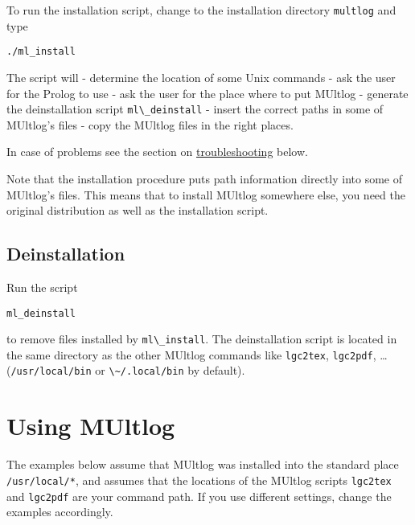 \documentclass[]{article}
\newcommand{\passthrough}[1]{#1}
\begin{document}
To run the installation script, change to the installation directory
\passthrough{\lstinline!multlog!} and type

\begin{lstlisting}
./ml_install
\end{lstlisting}

The script will - determine the location of some Unix commands - ask the
user for the Prolog to use - ask the user for the place where to put
MUltlog - generate the deinstallation script
\passthrough{\lstinline!ml\_deinstall!} - insert the correct paths in
some of MUltlog's files - copy the MUltlog files in the right places.

In case of problems see the section on
\protect\hyperlink{troubleshooting}{troubleshooting} below.

Note that the installation procedure puts path information directly into
some of MUltlog's files. This means that to install MUltlog somewhere
else, you need the original distribution as well as the installation
script.

\hypertarget{deinstallation}{%
\subsection{Deinstallation}\label{deinstallation}}

Run the script

\begin{lstlisting}
ml_deinstall
\end{lstlisting}

to remove files installed by \passthrough{\lstinline!ml\_install!}. The
deinstallation script is located in the same directory as the other
MUltlog commands like \passthrough{\lstinline!lgc2tex!},
\passthrough{\lstinline!lgc2pdf!}, \ldots{}
(\passthrough{\lstinline!/usr/local/bin!} or
\passthrough{\lstinline!\~/.local/bin!} by default).

\hypertarget{using-multlog}{%
\section{Using MUltlog}\label{using-multlog}}

The examples below assume that MUltlog was installed into the standard
place \passthrough{\lstinline!/usr/local/*!}, and assumes that the
locations of the MUltlog scripts \passthrough{\lstinline!lgc2tex!} and
\passthrough{\lstinline!lgc2pdf!} are your command path. If you use
different settings, change the examples accordingly.
\end{document}
